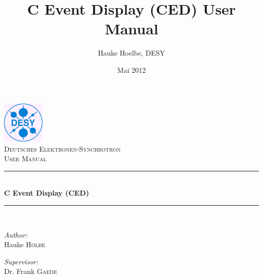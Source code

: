 \documentclass[a4paper,10pt]{article}
\title{C Event Display (CED) User Manual}
\author{Hauke Hoelbe, DESY}
\date{Mai 2012}
\newcommand{\HRule}{\rule{\linewidth}{0.5mm}}
\begin{document}


\begin{titlepage}
\begin{center}
    \includegraphics[width=0.15\textwidth]{img/desylogo.png}\\[1cm]    
    
    \textsc{\LARGE Deutsches Elektronen-Synchrotron }\\[1.5cm]
    
    \textsc{\Large User Manual}\\[0.5cm]
    
    
    \HRule \\[0.4cm]
    { \huge \bfseries C Event Display (CED)}\\[0.4cm]
    
    \HRule \\[1.5cm]
    
    \begin{minipage}{0.4\textwidth}
    \begin{flushleft} \large
    \emph{Author:}\\
    Hauke  \textsc{H\"olbe}
    \end{flushleft}
    \end{minipage}
    \begin{minipage}{0.4\textwidth}
    \begin{flushright} \large
    \emph{Supervisor:} \\
    Dr. Frank \textsc{Gaede}
    \end{flushright}
    \end{minipage}
    

\end{center}
\end{titlepage}
\end{document}
